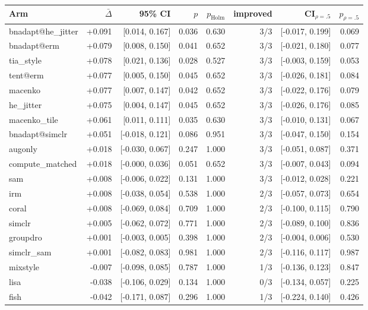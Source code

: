 \begin{tabular}{lrrrrrrr}
\toprule
Arm & $\bar\Delta$ & 95\% CI & $p$ & $p_\text{Holm}$ & improved & CI$_{\rho=.5}$ & $p_{\rho=.5}$ \\
\midrule
bnadapt@he\_jitter & +0.091 & [0.014, 0.167] & 0.036 & 0.630 & 3/3 & [-0.017, 0.199] & 0.069 \\
bnadapt@erm & +0.079 & [0.008, 0.150] & 0.041 & 0.652 & 3/3 & [-0.021, 0.180] & 0.077 \\
tia\_style & +0.078 & [0.021, 0.136] & 0.028 & 0.527 & 3/3 & [-0.003, 0.159] & 0.053 \\
tent@erm & +0.077 & [0.005, 0.150] & 0.045 & 0.652 & 3/3 & [-0.026, 0.181] & 0.084 \\
macenko & +0.077 & [0.007, 0.147] & 0.042 & 0.652 & 3/3 & [-0.022, 0.176] & 0.079 \\
he\_jitter & +0.075 & [0.004, 0.147] & 0.045 & 0.652 & 3/3 & [-0.026, 0.176] & 0.085 \\
macenko\_tile & +0.061 & [0.011, 0.111] & 0.035 & 0.630 & 3/3 & [-0.010, 0.131] & 0.067 \\
bnadapt@simclr & +0.051 & [-0.018, 0.121] & 0.086 & 0.951 & 3/3 & [-0.047, 0.150] & 0.154 \\
augonly & +0.018 & [-0.030, 0.067] & 0.247 & 1.000 & 3/3 & [-0.051, 0.087] & 0.371 \\
compute\_matched & +0.018 & [-0.000, 0.036] & 0.051 & 0.652 & 3/3 & [-0.007, 0.043] & 0.094 \\
sam & +0.008 & [-0.006, 0.022] & 0.131 & 1.000 & 3/3 & [-0.012, 0.028] & 0.221 \\
irm & +0.008 & [-0.038, 0.054] & 0.538 & 1.000 & 2/3 & [-0.057, 0.073] & 0.654 \\
coral & +0.008 & [-0.069, 0.084] & 0.709 & 1.000 & 2/3 & [-0.100, 0.115] & 0.790 \\
simclr & +0.005 & [-0.062, 0.072] & 0.771 & 1.000 & 2/3 & [-0.089, 0.100] & 0.836 \\
groupdro & +0.001 & [-0.003, 0.005] & 0.398 & 1.000 & 2/3 & [-0.004, 0.006] & 0.530 \\
simclr\_sam & +0.001 & [-0.082, 0.083] & 0.981 & 1.000 & 2/3 & [-0.116, 0.117] & 0.987 \\
mixstyle & -0.007 & [-0.098, 0.085] & 0.787 & 1.000 & 1/3 & [-0.136, 0.123] & 0.847 \\
lisa & -0.038 & [-0.106, 0.029] & 0.134 & 1.000 & 0/3 & [-0.134, 0.057] & 0.225 \\
fish & -0.042 & [-0.171, 0.087] & 0.296 & 1.000 & 1/3 & [-0.224, 0.140] & 0.426 \\
\bottomrule
\end{tabular}
